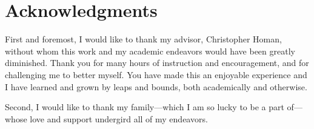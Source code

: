 
\chapter*{Acknowledgments}

First and foremost, I would like to thank my advisor, Christopher Homan, without whom this work and my academic endeavors would have been greatly diminished. Thank you for many hours of instruction and encouragement, and for challenging me to better myself. You have made this an enjoyable experience and I have learned and grown by leaps and bounds, both academically and otherwise.

Second, I would like to thank my family---which I am so lucky to be a part of---whose love and support undergird all of my endeavors.
